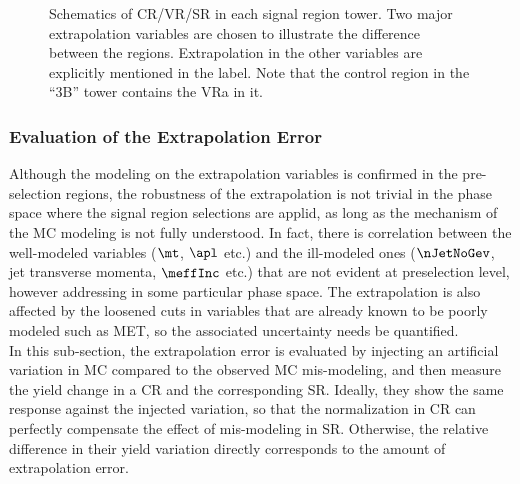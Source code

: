 \begin{figure}[h]
 \caption{ Schematics of CR/VR/SR in each signal region tower. Two major extrapolation variables are chosen to illustrate the difference between the regions. Extrapolation in the other variables are explicitly mentioned in the label. Note that the control region in the ``3B'' tower contains the VRa in it. 
   \label{fig::BGestimation::regionsPlot} 
 }
\end{figure}

\clearpage

%


\subsubsection{Evaluation of the Extrapolation Error} \label{sec::BGestimation::nonClosure_kineExtp}
Although the modeling on the extrapolation variables is confirmed in the pre-selection regions, 
the robustness of the extrapolation is not trivial in the phase space where the signal region selections are applid,
as long as the mechanism of the MC modeling is not fully understood. 
In fact, there is correlation between the well-modeled variables ($\mt$, $\apl$ etc.) and the ill-modeled ones ($\nJetNoGev$, jet transverse momenta, $\meffInc$ etc.) that are not evident at preselection level, however addressing in some particular phase space. 
The extrapolation is also affected by the loosened cuts in variables that are already known to be poorly modeled such as MET, so the associated uncertainty needs be quantified. \\

In this sub-section, the extrapolation error is evaluated by injecting an artificial variation in MC compared to the observed MC mis-modeling, and then measure the yield change in a CR and the corresponding SR. Ideally, they show the same response against the injected variation, so that the normalization in CR can perfectly compensate the effect of mis-modeling in SR. Otherwise, the relative difference in their yield variation directly corresponds to the amount of extrapolation error. \\

